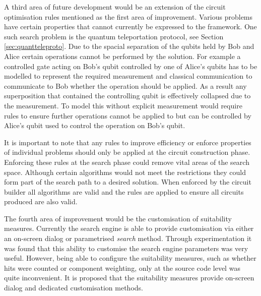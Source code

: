 A third area of future development would be an extension of the circuit optimisation rules mentioned as the first area of improvement.
Various problems have certain properties that cannot currently be expressed to the framework.
One such search problem is the quantum teleportation protocol, see Section \ref{sec:quantteleproto}.
Due to the spacial separation of the qubits held by Bob and Alice certain operations cannot be performed by the solution.
For example a controlled gate acting on Bob's qubit controlled by one of Alice's qubits has to be modelled to represent the required measurement and classical communication to communicate to Bob whether the operation should be applied.
As a result any superposition that contained the controlling qubit is effectively collapsed due to the measurement.
To model this without explicit measurement would require rules to ensure further operations cannot be applied to but can be controlled by Alice's qubit used to control the operation on Bob's qubit.

It is important to note that any rules to improve efficiency or enforce properties of individual problems should only be applied at the circuit construction phase.
Enforcing these rules at the search phase could remove vital areas of the search space.
Although certain algorithms would not meet the restrictions they could form part of the search path to a desired solution.
When enforced by the circuit builder all algorithms are valid and the rules are applied to ensure all circuits produced are also valid.

The fourth area of improvement would be the customisation of suitability measures.
Currently the search engine is able to provide customisation via either an on-screen dialog or parametrised \emph{search} method.
Through experimentation it was found that this ability to customise the search engine parameters was very useful.
However, being able to configure the suitability measures, such as whether hits were counted or component weighting, only at the source code level was quite inconvenient.
It is proposed that the suitability measures provide on-screen dialog and dedicated customisation methods.

